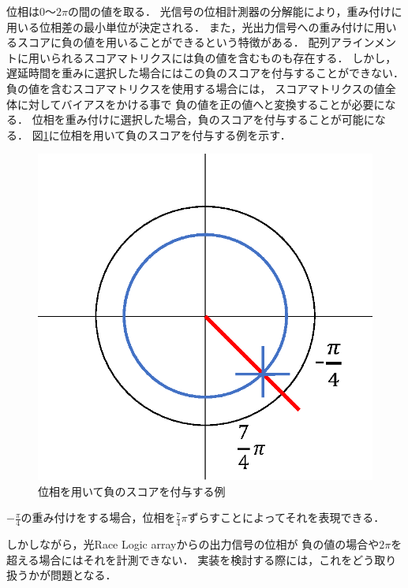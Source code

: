位相は$0〜2\pi$の間の値を取る．
光信号の位相計測器の分解能により，重み付けに用いる位相差の最小単位が決定される．
また，光出力信号への重み付けに用いるスコアに負の値を用いることができるという特徴がある．
配列アラインメントに用いられるスコアマトリクスには負の値を含むものも存在する．
しかし，遅延時間を重みに選択した場合にはこの負のスコアを付与することができない．
負の値を含むスコアマトリクスを使用する場合には，
スコアマトリクスの値全体に対してバイアスをかける事で
負の値を正の値へと変換することが必要になる．
位相を重み付けに選択した場合，負のスコアを付与することが可能になる．
図\ref{fig:isou}に位相を用いて負のスコアを付与する例を示す．
\begin{figure}[t!]
\begin{center}
\includegraphics[keepaspectratio,scale=0.5]{fig/5/isou.eps}
\caption{位相を用いて負のスコアを付与する例}
\label{fig:isou}
\end{center}
\end{figure}
$-\frac{\pi}{4}$の重み付けをする場合，位相を$\frac{7}{4}\pi$ずらすことによってそれを表現できる．

しかしながら，光Race Logic arrayからの出力信号の位相が
負の値の場合や$2\pi$を超える場合にはそれを計測できない．
実装を検討する際には，これをどう取り扱うかが問題となる．
